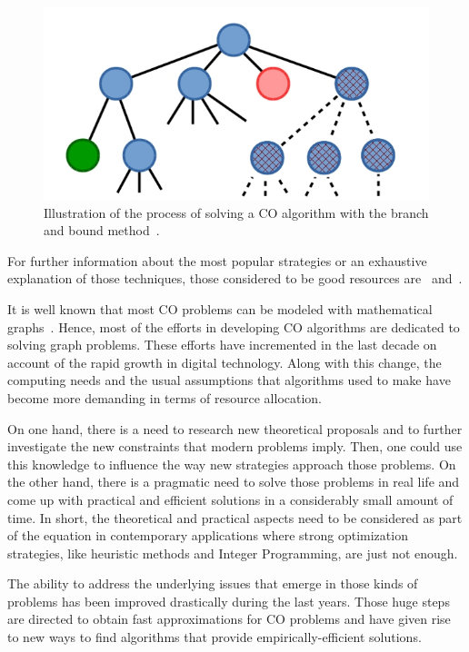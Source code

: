 \begin{figure}[h!]
    \centering
    \label{fig:branchbound}
    \includegraphics[scale=0.5]{theory_branch_and_bound.jpg}
    \caption{Illustration of the process of solving a CO algorithm with the branch and bound method~\cite{branchimage}.}
\end{figure}

For further information about the most popular strategies or an exhaustive explanation of those techniques, those considered to be good resources are~\cite{fernandes} and~\cite{integeroptimization}.

It is well known that most CO problems can be modeled with mathematical graphs~\citep{appcombinatorial}. Hence, most of the efforts in developing CO algorithms are dedicated to solving graph problems. These efforts have incremented in the last decade on account of the rapid growth in digital technology. Along with this change, the computing needs and the usual assumptions that algorithms used to make have become more demanding in terms of resource allocation.

On one hand, there is a need to research new theoretical proposals and to further investigate the new constraints that modern problems imply. Then, one could use this knowledge to influence the way new strategies approach those problems. On the other hand, there is a pragmatic need to solve those problems in real life and come up with practical and efficient solutions in a considerably small amount of time. In short, the theoretical and practical aspects need to be considered as part of the equation in contemporary applications where strong optimization strategies, like heuristic methods and Integer Programming, are just not enough.


The ability to address the underlying issues that emerge in those kinds of problems has been improved drastically during the last years. Those huge steps are directed to obtain fast approximations for CO problems and have given rise to new ways to find algorithms that provide empirically-efficient solutions.

